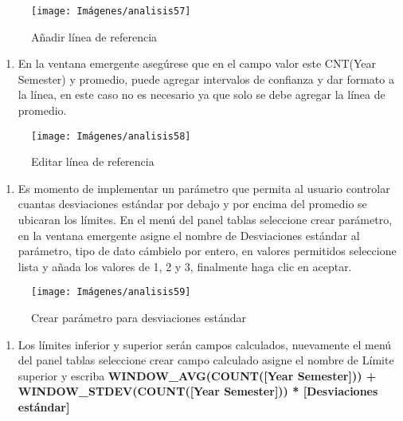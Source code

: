 \documentclass[
]{book}
\providecommand{\tightlist}{%
  \setlength{\itemsep}{0pt}\setlength{\parskip}{0pt}}
\begin{document}
\begin{figure}

{\centering \texttt{[image: Imágenes/analisis57]} 

}

\caption{Añadir línea de referencia}\label{fig:paso8graficodecontrol-fig}
\end{figure}

\begin{enumerate}
\def\labelenumi{\arabic{enumi}.}
\setcounter{enumi}{8}
\tightlist
\item
  En la ventana emergente asegúrese que en el campo valor este CNT(Year Semester) y promedio, puede agregar intervalos de confianza y dar formato a la línea, en este caso no es necesario ya que solo se debe agregar la línea de promedio.
\end{enumerate}

\begin{figure}

{\centering \texttt{[image: Imágenes/analisis58]} 

}

\caption{Editar línea de referencia}\label{fig:paso9graficodecontrol-fig}
\end{figure}

\begin{enumerate}
\def\labelenumi{\arabic{enumi}.}
\setcounter{enumi}{9}
\tightlist
\item
  Es momento de implementar un parámetro que permita al usuario controlar cuantas desviaciones estándar por debajo y por encima del promedio se ubicaran los límites. En el menú del panel tablas seleccione crear parámetro, en la ventana emergente asigne el nombre de Desviaciones estándar al parámetro, tipo de dato cámbielo por entero, en valores permitidos seleccione lista y añada los valores de 1, 2 y 3, finalmente haga clic en aceptar.
\end{enumerate}

\begin{figure}

{\centering \texttt{[image: Imágenes/analisis59]} 

}

\caption{Crear parámetro para desviaciones estándar}\label{fig:paso10graficodecontrol-fig}
\end{figure}

\begin{enumerate}
\def\labelenumi{\arabic{enumi}.}
\setcounter{enumi}{10}
\tightlist
\item
  Los límites inferior y superior serán campos calculados, nuevamente el menú del panel tablas seleccione crear campo calculado asigne el nombre de Límite superior y escriba \textbf{WINDOW\_AVG(COUNT({[}Year Semester{]})) + WINDOW\_STDEV(COUNT({[}Year Semester{]})) * {[}Desviaciones estándar{]}}
\end{enumerate}
\end{document}
